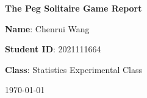 \begin{titlepage}
    \centering
    \vspace*{3cm}
    {\LARGE \textbf{The Peg Solitaire Game Report}\par}
    \vspace{2cm}
    {\large \textbf{Name}: Chenrui Wang \par}
    \vspace{0.5cm}
    {\large \textbf{Student ID}: 2021111664 \par}
    \vspace{0.5cm}
    {\large \textbf{Class}: Statistics Experimental Class \par}
    \vspace{2cm}
    {\large \today\par}
    \vfill
\end{titlepage}


